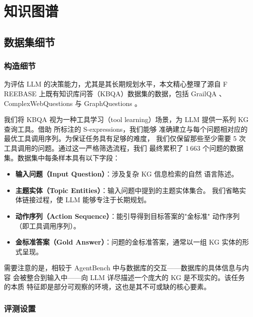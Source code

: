 
\section{知识图谱}\label{app:kg}

\subsection{数据集细节}

\subsubsection*{构造细节}

为评估 LLM 的决策能力，尤其是其长期规划水平，本文精心整理了源自
F REEBASE 上既有知识库问答（KBQA）数据集的数据，包括 GrailQA
\citep{gu2021beyond}、ComplexWebQuestions \citep{talmor2018complexwebquestions}
与 GraphQuestions \citep{su2016}。

我们将 KBQA 视为一种工具学习（tool learning）场景，为 LLM 提供一系列
KG 查询工具。借助 \citet{gu2022arcaneqa} 所标注的 S-expressions，我们能够
准确建立与每个问题相对应的最优工具调用序列。为保证任务具有足够的难度，
我们仅保留那些至少需要 5 次工具调用的问题。通过这一严格筛选流程，我们
最终累积了 1\,663 个问题的数据集。数据集中每条样本具有以下字段：
\begin{itemize}
    \item \textbf{输入问题（Input Question）}：涉及复杂 KG 信息检索的自然
          语言陈述。
    \item \textbf{主题实体（Topic Entities）}：输入问题中提到的主题实体集合。
          我们省略实体链接过程，使 LLM 能够专注于长期规划。
    \item \textbf{动作序列（Action Sequence）}：能引导得到目标答案的"金标准"
          动作序列（即工具调用序列）。
    \item \textbf{金标准答案（Gold Answer）}：问题的金标准答案，通常以一组
          KG 实体的形式呈现。
\end{itemize}

需要注意的是，相较于 AgentBench 中与数据库的交互——数据库的具体信息与内容
会被整合到输入中——向 LLM 详尽描述一个庞大的 KG 是不现实的。该任务的本质
特征即是部分可观察的环境，这也是其不可或缺的核心要素。

\subsubsection*{评测设置}


